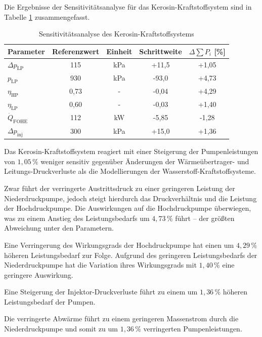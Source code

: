 Die Ergebnisse der Sensitivitätsanalyse für das Kerosin-Kraftstoffsystem sind in Tabelle \ref{Tab:sensjeta} zusammengefasst.

\begin{table}[ht]
	\centering
	\caption{Sensitivitätsanalyse des Kerosin-Kraftstoffsystems}
	\begin{tabular} {|l|c|c|c|c|} \hline%
		Parameter & Referenzwert & Einheit & Schrittweite & $ \Delta \sum P_i$ [\%] \\ \hline\hline%
		$\Delta p_\mathrm{LP}$ & 115 & \si{\kilo\Pa} & +11,5 & +1,05 \\ \hline 
		$p_\mathrm{LP}$ & 930 & \si{\kilo\Pa} & -93,0 & +4,73 \\ \hline 
		$\eta_\mathrm{HP}$ & 0,73 & - & -0,04 & +4,29 \\ \hline 
		$\eta_\mathrm{LP}$ & 0,60 & - & -0,03 & +1,40 \\ \hline 
		$\dot{Q}_\mathrm{FOHE}$ & 112 & \si{\kilo\W} & -5,85 & -1,28 \\ \hline 
		$\Delta p_\mathrm{inj}$ & 300 & \si{\kilo\Pa} & +15,0 & +1,36 \\ \hline 
	\end{tabular}	
	\label{Tab:sensjeta}%
\end{table}
\FloatBarrier 

Das Kerosin-Kraftstoffsystem reagiert mit einer Steigerung der Pumpenleistungen von $1,05\,\%$ weniger sensitiv gegenüber Änderungen der Wärmeübertrager- und Leitungs-Druckverluste als die Modellierungen der Wasserstoff-Kraftstoffsysteme.

Zwar führt der verringerte Austrittsdruck zu einer geringeren Leistung der Niederdruckpumpe, jedoch steigt hierdurch das Druckverhältnis und die Leistung der Hochdruckpumpe. Die Auswirkungen auf die Hochdruckpumpe überwiegen, was zu einem Anstieg des Leistungsbedarfs um $4,73\,\%$ führt – der größten Abweichung unter den Parametern. 

Eine Verringerung des Wirkungsgrads der Hochdruckpumpe hat einen um $4,29\,\%$ höheren Leistungsbedarf zur Folge. Aufgrund des geringeren Leistungsbedarfs der Niederdruckpumpe hat die Variation ihres Wirkungsgrads mit $1,40\,\%$ eine geringere Auswirkung. 

Eine Steigerung der Injektor-Druckverluste führt zu einem um $1,36\,\%$ höheren Leistungsbedarf der Pumpen. 

Die verringerte Abwärme führt zu einem geringeren Massenstrom durch die Niederdruckpumpe und somit zu um $1,36\,\%$ verringerten Pumpenleistungen.

